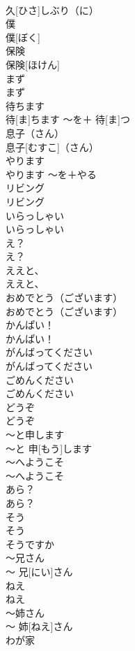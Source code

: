 \documentclass[8pt]{extreport}
\begin{document}
\begin{CJK}{UTF8}{min}
\\	久[ひさ]しぶり（に）		
\\	僕	
\\	僕[ぼく]		
\\	保険	
\\	保険[ほけん]		
\\	まず	
\\	まず		
\\	待ちます	
\\	待[ま]ちます	〜を＋ 待[ま]つ	
\\	息子（さん）	
\\	息子[むすこ]（さん）		
\\	やります	
\\	やります	〜を＋やる	
\\	リビング	
\\	リビング		
\\	いらっしゃい	
\\	いらっしゃい		
\\	え？	
\\	え？		
\\	ええと、	
\\	ええと、		
\\	おめでとう（ございます）	
\\	おめでとう（ございます）		
\\	かんぱい！	
\\	かんぱい！		
\\	がんばってください	
\\	がんばってください		
\\	ごめんください	
\\	ごめんください		
\\	どうぞ	
\\	どうぞ		
\\	〜と申します	
\\	〜と 申[もう]します		
\\	〜へようこそ	
\\	〜へようこそ		
\\	あら？	
\\	あら？		
\\	そう	
\\	そう	
\\	そうですか 
\\	〜兄さん	
\\	〜 兄[にい]さん		
\\	ねえ	
\\	ねえ		
\\	〜姉さん	
\\	〜 姉[ねえ]さん		
\\	わが家	

\end{CJK}
\end{document}
